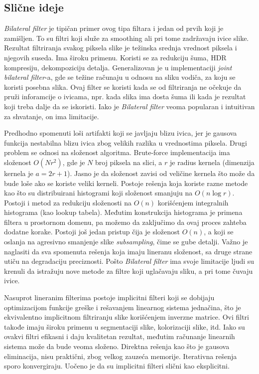\documentclass[a4paper,12pt,titlepage]{article}
\begin{document}
\subsection{Slične ideje}%

\emph{Bilateral filter} je tipičan primer ovog tipa filtara i jedan od prvih koji je zamišljen. To su filtri koji služe za smoothing ali pri tome zadržavaju ivice slike. Rezultat filtriranja svakog piksela slike je težinska srednja vrednost piksela i njegovih suseda. Ima široku primenu. Koristi se za redukciju šuma, HDR kompresiju, dekompoziciju detalja. Generalizovan je u implementaciji \emph{joint bilateral filter}-a, gde se težine računaju u odnosu na sliku vodiča, za koju se koristi posebna slika. Ovaj filter se koristi kada se od filtriranja ne očekuje da pruži inforamcije o ivicama, npr. kada slika ima dosta šuma ili kada je rezultat koji treba dalje da se iskoristi. Iako je \emph{Bilateral filter} veoma popularan i intuitivan za shvatanje, on ima limitacije. 

Predhodno spomenuti loši artifakti koji se javljaju blizu ivica, jer je gausova funkcija nestabilna blizu ivica zbog velikih razlika u vrednostima piksela. Drugi problem se odnosi na složenost algoritma. Brute-force implementacija ima složenost $O(Nr^2)$, gde je $N$ broj piksela na slici, a $r$ je radius kernela (dimenzija kernela je $a = 2r + 1$). Jasno je da složenost zavisi od veličine kernela što može da bude loše ako se koriste veliki kerneli. Postoje rešenja koja koriste razne metode kao što su distribuirani histogrami koji složenost smanjuju na $O(n \log{r})$. Postoji i metod za redukciju složenosti na $O(n)$ korišćenjem integralnih histograma (kao lookup tabela). Međutim konstrukcija histograma je primena filtera u prostornom domenu, pa možemo da zaključimo da ovaj proces zahteba dodatne korake. Postoji još jedan pristup čija je složenost $O(n)$, a koji se oslanja na agresivno smanjenje slike \emph{subsampling}, čime se gube detalji. Važno je naglasiti da sva spomenuta rešenja koja imaju lineranu složenost, sa druge strane utiču na degradaciju preciznosti. Pošto \emph{Bilateral filter} ima svoje limitacije ljudi su krenuli da istražuju nove metode za filtre koji uglačavaju sliku, a pri tome čuvaju ivice. 

Nasuprot lineranim filterima postoje implicitni filteri koji se dobijaju optimizacijom funkcije greške i rešavanjem linearnog sistema jednačina, što je ekvivalentno implicitnom filtriranju slike korišćenjem inverzne matrice. Ovi filtri takođe imaju široku primenu u segmentaciji slike, kolorizaciji slike, itd. Iako su ovakvi filtri efikasni i daju kvalitetan rezultat, međutim računanje linearnih sistema može da bude veoma složeno. Direktna rešenja kao što je gausova eliminacija, nisu praktični, zbog velkog zauzeća memorije. Iterativna rešenja sporo konvergiraju. Uočeno je da su implicitni filteri slični kao eksplicitni. 
\end{document}
